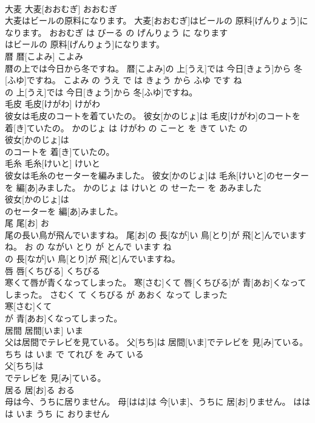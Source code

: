 \documentclass[8pt]{extreport}
\begin{document}
\begin{CJK}{UTF8}{min}
\\	大麦	大麦[おおむぎ]	おおむぎ	
\\	大麦はビールの原料になります。	大麦[おおむぎ]はビールの 原料[げんりょう]になります。	おおむぎ は びーる の げんりょう に なります	
\\	はビールの 原料[げんりょう]になります。			
\\	暦	暦[こよみ]	こよみ	
\\	暦の上では今日から冬ですね。	暦[こよみ]の 上[うえ]では 今日[きょう]から 冬[ふゆ]ですね。	こよみ の うえ で は きょう から ふゆ です ね	
\\	の 上[うえ]では 今日[きょう]から 冬[ふゆ]ですね。			
\\	毛皮	毛皮[けがわ]	けがわ	
\\	彼女は毛皮のコートを着ていたの。	彼女[かのじょ]は 毛皮[けがわ]のコートを 着[き]ていたの。	かのじょ は けがわ の こーと を きて いた の	
\\	彼女[かのじょ]は
\\	のコートを 着[き]ていたの。			
\\	毛糸	毛糸[けいと]	けいと	
\\	彼女は毛糸のセーターを編みました。	彼女[かのじょ]は 毛糸[けいと]のセーターを 編[あ]みました。	かのじょ は けいと の せーたー を あみました	
\\	彼女[かのじょ]は
\\	のセーターを 編[あ]みました。			
\\	尾	尾[お]	お	
\\	尾の長い鳥が飛んでいますね。	尾[お]の 長[なが]い 鳥[とり]が 飛[と]んでいますね。	お の ながい とり が とんで います ね	
\\	の 長[なが]い 鳥[とり]が 飛[と]んでいますね。			
\\	唇	唇[くちびる]	くちびる	
\\	寒くて唇が青くなってしまった。	寒[さむ]くて 唇[くちびる]が 青[あお]くなってしまった。	さむく て くちびる が あおく なって しまった	
\\	寒[さむ]くて
\\	が 青[あお]くなってしまった。			
\\	居間	居間[いま]	いま	
\\	父は居間でテレビを見ている。	父[ちち]は 居間[いま]でテレビを 見[み]ている。	ちち は いま で てれび を みて いる	
\\	父[ちち]は
\\	でテレビを 見[み]ている。			
\\	居る	居[お]る	おる	
\\	母は今、うちに居りません。	母[はは]は 今[いま]、うちに 居[お]りません。	はは は いま うち に おりません	

\end{CJK}
\end{document}

